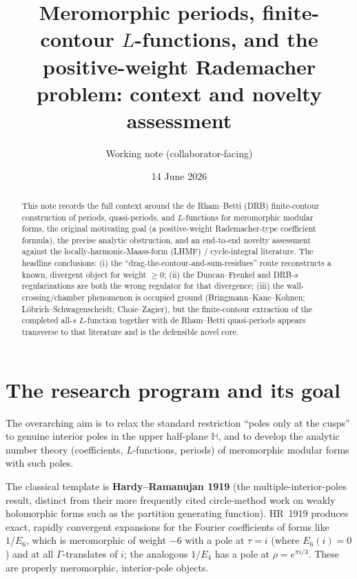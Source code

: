 \documentclass[11pt]{article}
\title{\textbf{Meromorphic periods, finite-contour $L$-functions, and the\\
positive-weight Rademacher problem: context and novelty assessment}}
\author{Working note (collaborator-facing)}
\date{14 June 2026}
\newcommand{\HH}{\mathbb{H}}
\newcommand{\Gam}{\Gamma}
\begin{document}
\maketitle

\begin{abstract}
This note records the full context around the de Rham--Betti (DRB) finite-contour
construction of periods, quasi-periods, and $L$-functions for meromorphic modular
forms, the original motivating goal (a positive-weight Rademacher-type coefficient
formula), the precise analytic obstruction, and an end-to-end novelty assessment
against the locally-harmonic-Maass-form (LHMF) / cycle-integral literature. The
headline conclusions: (i) the ``drag-the-contour-and-sum-residues'' route reconstructs
a known, divergent object for weight $\ge 0$; (ii) the Duncan--Frenkel and DRB-$s$
regularizations are both the wrong regulator for that divergence; (iii) the
wall-crossing/chamber phenomenon is occupied ground (Bringmann--Kane--Kohnen;
L\"obrich--Schwagenscheidt; Choie--Zagier), but the finite-contour extraction of the
completed all-$s$ $L$-function together with de Rham--Betti quasi-periods appears
transverse to that literature and is the defensible novel core.
\end{abstract}

\section{The research program and its goal}

The overarching aim is to relax the standard restriction ``poles only at the cusps''
to genuine interior poles in the upper half-plane $\HH$, and to develop the analytic
number theory (coefficients, $L$-functions, periods) of meromorphic modular forms with
such poles.

The classical template is \textbf{Hardy--Ramanujan 1919} (the multiple-interior-poles
result, distinct from their more frequently cited circle-method work on weakly
holomorphic forms such as the partition generating function). HR~1919 produces exact,
rapidly convergent expansions for the Fourier coefficients of forms like $1/E_6$, which
is meromorphic of weight $-6$ with a pole at $\tau=i$ (where $E_6(i)=0$) and at all
$\Gam$-translates of $i$; the analogous $1/E_4$ has a pole at $\rho=e^{\pi i/3}$. These
are properly meromorphic, interior-pole objects.
\end{document}
